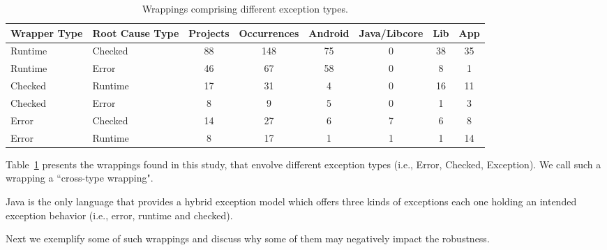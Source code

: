 \documentclass[conference]{IEEEtran}
\begin{document}
\begin{table}
  \centering
  \begin{tabular}{llcccccc}
    \hline
    \bfseries{Wrapper Type}  &  \bfseries{Root Cause Type} &  \bfseries{Projects}  &  \bfseries{Occurrences} & \textsf{Android} & \textsf{Java/Libcore} & \textsf{Lib} & \textsf{App}  \\
    \hline
      
      Runtime &  Checked   & 88 & 148 &  75  &  0   & 38 &  35 \\
      Runtime   &  Error   & 46  &  67    &  58  &  0   & 8  &  1   \\      
      Checked &  Runtime   & 17  & 31 & 4 &  0  & 16 &  11 \\
      Checked & Error      & 8 &  9  & 5  &  0  &  1 &  3  \\
      Error & Checked      & 14 &  27 &  6  &  7  &  6 &   8    \\
      Error & Runtime     & 8  &  17   & 1 &  1  & 1 &  14    \\

  \hline
  \end{tabular}
\caption{Wrappings comprising different exception types.}
\label{tab:wrappingandroid}
\end{table}

Table~\ref{tab:wrappingandroid} presents the wrappings found in this study, that
envolve different exception types (i.e., Error, Checked, Exception). We call 
such a wrapping a ``cross-type wrapping". 

Java is the only language that provides a hybrid exception model 
which offers three kinds of exceptions each one holding an intended exception behavior (i.e., error, 
runtime and checked). 

Next we exemplify some of such
 wrappings and discuss why some of them may negatively impact the robustness.
\end{document}

